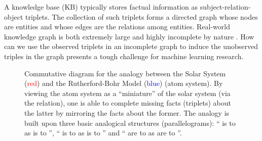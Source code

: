 \documentclass{article}
\begin{document}
A knowledge base (KB) typically stores factual information as subject-relation-object triplets. 
The collection of such triplets forms a directed graph whose nodes are entities and whose edges are the relations among entities.
Real-world knowledge graph is both extremely large and highly incomplete by nature \cite{min2013distant}.  How can we use the observed triplets in an incomplete graph to induce the unobserved triples in the graph presents a tough challenge for machine learning research.  
\begin{figure}[t]
    \centering
    \caption{Commutative diagram for the analogy between the Solar System (\textcolor{red}{red}) and the Rutherford-Bohr Model (\textcolor{blue}{blue}) (atom system).
    By viewing the atom system as a ``miniature'' of the solar system (via the  relation),
    one is able to complete missing facts (triplets) about the latter by mirroring the facts about the former.
        The analogy is built upon three basic analogical structures (parallelograms):
        `` is to  as  is to '', `` is to  as  is to '' and `` are to  as  are to ''.
    }
    \label{fig:solar}
\end{figure}
\end{document}
